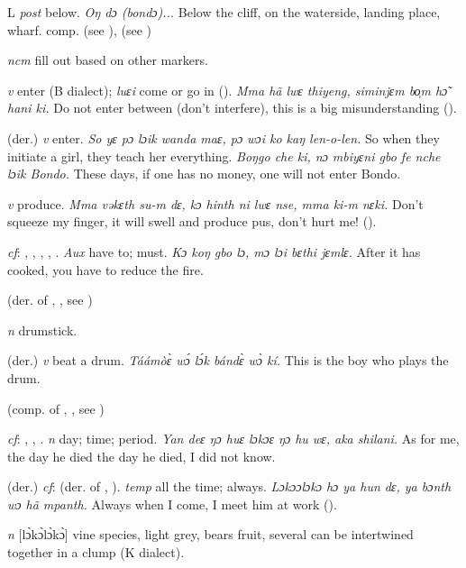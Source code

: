 \begin{letter}{L}
 \textit{post} below. \textit{Oŋ dɔ (bondɔ)...} Below the cliff, on the waterside, landing place, wharf. comp.  (see ),  (see ) 

 \textit{ncm} fill out based on other markers. 
 
 \textit{v} enter (B dialect); \textit{luɛi} come or go in (\citealt{Sumner1921}). \textit{Mma hã lwɛ thiyeng, siminjɛm bo̹m hɔ̃ hani ki.} Do not enter between (don't interfere), this is a big misunderstanding (\citealt{Pichl1967}). 

 (der.) \textit{v} enter. \textit{So yɛ pɔ lɔik wanda maɛ, pɔ wɔi ko kaŋ len-o-len.} So when they initiate a girl, they teach her everything. \textit{Boŋgo che ki, nɔ mbiyɛni gbo fe nche lɔik Bondo.} These days, if one has no money, one will not enter Bondo.

 \textit{v} produce. \textit{Mma vəkɛth su-m dɛ, kɔ hinth ni lwɛ nse, mma ki-m nɛki.} Don't squeeze my finger, it will swell and produce pus, don't hurt me! (\citealt{Pichl1967}). 

 \textit{cf}: , , , , . \textit{Aux} have to; must. \textit{Kɔ koŋ gbo lɔ, mɔ lɔi bɛthi jɛmlɛ.} After it has cooked, you have to reduce the fire.

 (der. of , , see ) 

 \textit{n} drumstick.

 (der.) \textit{v} beat a drum. \textit{Táámòɛ̀ wɔ́ lɔ́k bándɛ̀ wɔ̀ kí.} This is the boy who plays the drum. 

 (comp. of , , see ) 

 \textit{cf}: , , . \textit{n} day; time; period. \textit{Yan deɛ ŋɔ huɛ lɔkɔɛ ŋɔ hu wɛ, aka shilani.} As for me, the day he died the day he died, I did not know.

 (der.) \textit{cf}:  (der. of , ). \textit{temp} all the time; always. \textit{Lɔkɔɔlɔkɔ hɔ ya hun dɛ, ya bɔnth wɔ hã mpanth.} Always when I come, I meet him at work (\citealt{Pichl1967}). 

 \textit{n} [lɔ̀kɔ̀lɔ̀kɔ̀] vine species, light grey, bears fruit, several can be intertwined together in a clump (K dialect). 


\end{letter}
